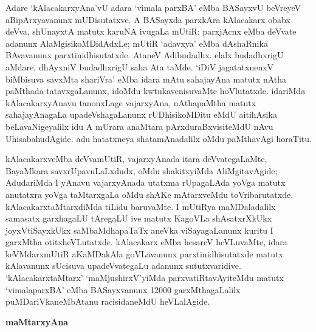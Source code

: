 Adare `kAlacakarxyAna'vU adara `vimala parxBA' eMba BASayxvU beVreyeV aBipArxyavanunx mUDisutatxve. A BASayxda parxkAra kAlacakarx obabx deVva, shUnayxtA matutx karuNA ivugaLa mUtiR; parxjAcnx eMba deVvate adanunx AlaMgisikoMDidAdxLe; mUtiR `adavxya' eMba dAshaRnika BAvavanunx parxtinidhisutatxde. AtaneV Adibudadhx. elalx budadhxrigU aMdare, dhAyxniV budadhxrigU saha Ata taMde. `iDiV jagatatxnenxV biMbisuva savxMta shariVra' eMba idara mAtu sahajayAna matutx nAtha paMthada tatavxgaLanunx, idoMdu kwtukavenisuvaMte hoVlutatxde. idariMda kAlacakarxyAnavu tanonxLage vajarxyAna, nAthapaMtha matutx sahajayAnagaLa upadeVshagaLanunx rUDhisikoMDitu eMdU aitihAsika beLavaNigeyalilx idu A mUrara anaMtara pArxduraBxvisiteMdU nAvu UhisabahudAgide. adu hatatxneya shatamAnadalilx oMdu paMthavAgi horaTitu.

kAlacakarxveMba deVvamUtiR, vajarxyAnada itara deVvategaLaMte, BayaMkara savxrUpavuLaLxdudx, oMdu shakitxyiMda AliMgitavAgide; AdudariMda I yAnavu vajarxyAnada utatxma rUpagaLAda yoVga matutx anutatxra yoVga taMtarxgaLa oMdu shAKe mAtarxveMdu toVribarutatxde. kAlacakarxtaMtarxdiMda tiLidu baruvaMte. I mUtiRya maMDaladalilx samasatx garxhagaLU tAregaLU ive matutx KagoVLa shAsatxrXkUkx joyxVtiSayxkUkx saMbaMdhapaTaTx aneVka viSayagaLanunx kuritu I garxMtha otitxheVLutatxde. kAlacakarx eMba hesareV heVLuvaMte, idara keVMdarxmUtiR aKaMDakAla goVLavanunx parxtinidhisutatxde matutx kAlavanunx sUcisuva upadeVvategaLu adanunx sututxvaridive. `kAlacakarxtaMtarx' `maMjushirxV'yiMda parxvatiRtavAyiteMdu matutx `vimalaparxBA' eMba BASayxvanunx {\rm 12000} garxMthagaLalilx puMDariVkaneMbAtanu racisidaneMdU heVLalAgide.

\smallskip
\begin{center}
{\Large\bf maMtarxyAna}
\end{center}


